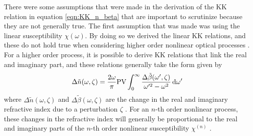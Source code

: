 There were some assumptions that were made in the derivation of the KK relation in equation \ref{eqn:KK_n_beta} that are important to scrutinize because they are not generally true.  The first assumption that was made was using the linear susceptibility $\chi(\omega)$.  By doing so we derived the linear KK relations, and these do not hold true when considering higher order nonlinear optical processes \cite{lucariniKramersKronigRelationsOptical2005, hutchingsKramersKronigRelationsNonlinear1992}.  For a higher order process, it is possible to derive KK relations that link the real and imaginary part, and these relations generally take the form given by
\begin{equation}
	\label{eqn:dn_db_KK}
	\Delta\tilde{n}(\omega, \zeta) = \frac{2\omega}{\pi} \mathrm{PV}\int_{0}^{\infty} \frac{\Delta\tilde{\beta}(\omega',\zeta)}{\omega'^2 - \omega^2} \mathop{}\!\mathrm{d} \omega'
\end{equation}  
where $\Delta\tilde{n}(\omega, \zeta)$ and $\Delta\tilde{\beta}(\omega,\zeta)$ are the change in the real and imaginary refractive index due to a perturbation $\zeta$ \cite{hutchingsKramersKronigRelationsNonlinear1992, lucariniKramersKronigRelationsOptical2005}.  For an $n$-th order nonlinear process, these changes in the refractive index will generally be proportional to the real and imaginary parts of the $n$-th order nonlinear susceptibility $\chi^{(n)}$ \cite{boydNonlinearOptics2008, lucariniKramersKronigRelationsOptical2005, hutchingsKramersKronigRelationsNonlinear1992}.

